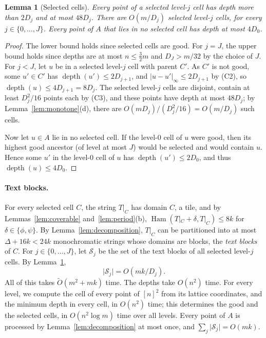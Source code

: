 \documentclass[11pt]{article}
\newtheorem{lemma}[theorem]{Lemma}
\theoremstyle{definition}
\newcommand{\tO}{\tilde{O}}
\renewcommand{\O}{O}
\DeclareMathOperator{\Ham}{Ham}
\DeclareMathOperator{\depth}{depth}
\newcommand{\cS}{\mathcal{S}}
\newcommand{\abs}[1]{\lvert #1 \rvert}
\newcommand{\inorm}[1]{\lvert #1 \rvert_\infty}
\begin{document}
\begin{lemma}[Selected cells]\label{lem:levels}
Every point of a selected level-$j$ cell has depth more than $2D_j$ and at most $48D_j$.
There are $\O(m/D_j)$ selected level-$j$ cells, for every $j \in \{0, \dots, J\}$.
Every point of $A$ that lies in no selected cell has depth at most $4D_0$.
\end{lemma}
\begin{proof}
The lower bound holds since selected cells are good.
For $j = J$, the upper bound holds since depths are at most $n \le \frac32 m$ and $D_J > m/32$ by the choice of $J$.
For $j < J$, let $u$ be in a selected level-$j$ cell with parent $C'$.
As $C'$ is not good, some $u' \in C'$ has $\depth(u') \le 2D_{j+1}$, and $\inorm{u - u'} \le 2D_{j+1}$ by (C2), so $\depth(u) \le 4D_{j+1} = 8D_j$.
The selected level-$j$ cells are disjoint, contain at least $D_j^2/16$ points each by (C3), and these points have depth at most $48D_j$; by Lemma~\ref{lem:monotone}(d), there are $\O(mD_j)/(D_j^2/16) = \O(m/D_j)$ such cells.

Now let $u \in A$ lie in no selected cell.
If the level-$0$ cell of $u$ were good, then its highest good ancestor (of level at most $J$) would be selected and would contain $u$.
Hence some $u'$ in the level-$0$ cell of $u$ has $\depth(u') \le 2D_0$, and thus $\depth(u) \le 4D_0$.
\end{proof}

\paragraph{Text blocks.} For every selected cell $C$, the string $T|_C$ has domain $C$, a tile, and by Lemmas~\ref{lem:coverable} and~\ref{lem:period}(b), $\Ham(T|_C + \delta, T|_C) \le 8k$ for $\delta \in \{\phi,\psi\}$.
By Lemma~\ref{lem:decomposition}, $T|_C$ can be partitioned into at most $\Delta + 16k < 24k$ monochromatic strings whose domains are blocks, the \emph{text blocks} of $C$.
For $j \in \{0,\dots,J\}$, let $\cS_j$ be the set of the text blocks of all selected level-$j$ cells.
By Lemma~\ref{lem:levels},
\begin{equation}\label{eq:pieces}
\abs{\cS_j} = \O(mk/D_j).
\end{equation}
All of this takes $\tO(m^2 + mk)$ time.
The depths take $\O(n^2)$ time.
For every level, we compute the cell of every point of $[n]^2$ from its lattice coordinates, and the minimum depth in every cell, in $\O(n^2)$ time; this determines the good and the selected cells, in $\O(n^2 \log m)$ time over all levels.
Every point of $A$ is processed by Lemma~\ref{lem:decomposition} at most once, and $\sum_j \abs{\cS_j} = \O(mk)$.
\end{document}
